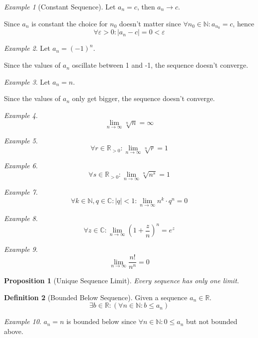 \documentclass[english,titlepage]{uzhpub}
\theoremstyle{definition}
\newtheorem{definition}{Definition}[section]
\theoremstyle{plain}
\newtheorem{proposition}[definition]{Proposition}
\theoremstyle{remark}
\theoremstyle{example}
\newtheorem*{example}{Example}
\begin{document}
   \begin{example}[Constant Sequence]
      Let \(a_n = c\), then \(a_n \to c\).

      Since \(a_n\) is constant the choice for \(n_0\) doesn't matter since \(\forall n_0 \in \mathbb{N}: a_{n_0} = c\), hence
      \[\forall \varepsilon > 0: |a_n - c| = 0 < \varepsilon\]
   \end{example}
   \begin{example}
      Let \(a_n = (-1)^n\).

      Since the values of \(a_n\) oscillate between 1 and -1, the sequence doesn't converge.
   \end{example}
   \begin{example}
      Let \(a_n = n\).

      Since the values of \(a_n\) only get bigger, the sequence doesn't converge.
   \end{example}
   \begin{example}
      \[\lim_{n \to \infty} \sqrt[n]{n} = \infty\]
   \end{example}
   \begin{example}
      \[\forall r \in \mathbb{R}_{>0}: \lim_{n \to \infty} \sqrt[n]{r} = 1\]
   \end{example}
   \begin{example}
      \[\forall s \in \mathbb{R}_{>0}: \lim_{n \to \infty} \sqrt[n]{n^s} = 1\]
   \end{example}
   \begin{example}
      \[\forall k \in \mathbb{N}, q \in \mathbb{C}: |q| < 1: \lim_{n \to \infty} n^k \cdot q^n = 0\]
   \end{example}
   \begin{example}
      \[\forall z \in \mathbb{C}: \lim_{n \to \infty} \left(1 + \frac{z}{n}\right)^n = e^z\]
   \end{example}
   \begin{example}
      \[\lim_{n \to \infty} \frac{n!}{n^n} = 0\]
   \end{example}

   \begin{proposition}[Unique Sequence Limit]\label{pro:unique_limit}
      Every sequence has only one limit.
   \end{proposition}

   \begin{definition}[Bounded Below Sequence]
      Given a sequence \(a_n \in \mathbb{R}\).
      \[\exists b \in \mathbb{R}: (\forall n \in \mathbb{N}: b \leq a_n)\]
   \end{definition}
   \begin{example}
      \(a_n = n\) is bounded below since \(\forall n \in \mathbb{N}: 0 \leq a_n\) but not bounded above.
   \end{example}
\end{document}
